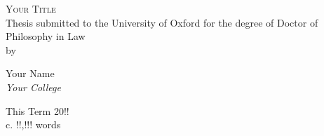 \begin{titlepage}

\begin{center}



\vspace*{\fill}
\centering

{\Huge\textsc{Your Title}}\\[3cm]

\large {Thesis submitted to the University of Oxford for the degree of Doctor of Philosophy in Law}\\

by

{Your Name}\\

\emph{{Your College}}\\
\vspace*{\fill}

 

\vfill

{\Large This Term 20!!}\\
{c. !!,!!! words}

\end{center}

\end{titlepage}
